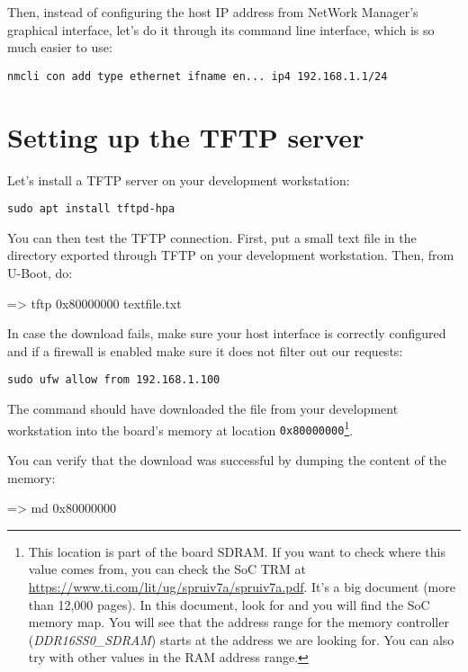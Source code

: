 Then, instead of configuring the host IP address from NetWork Manager's
graphical interface, let's do it through its command line interface,
which is so much easier to use:

\begin{verbatim}
nmcli con add type ethernet ifname en... ip4 192.168.1.1/24
\end{verbatim}

\section{Setting up the TFTP server}

Let's install a TFTP server on your development workstation:

\begin{verbatim}
sudo apt install tftpd-hpa
\end{verbatim}

You can then test the TFTP connection. First, put a small text file in
the directory exported through TFTP on your development
workstation. Then, from U-Boot, do:

\begin{ubootinput}
=> tftp 0x80000000 textfile.txt
\end{ubootinput}

In case the download fails, make sure your host interface is correctly
configured and if a firewall is enabled make sure it does not filter out our
requests:
\begin{verbatim}
sudo ufw allow from 192.168.1.100
\end{verbatim}

The  command should have downloaded the
 file from your development workstation into
the board's memory at location {\tt 0x80000000}\footnote{
This location is part of the board SDRAM. If you want
to check where this value comes from, you can check the SoC
TRM at
\url{https://www.ti.com/lit/ug/spruiv7a/spruiv7a.pdf}.
It's a big document (more than 12,000 pages). In this document, look
for  and you will find the SoC memory map.
You will see that the address range for the memory controller
({\em DDR16SS0\_SDRAM})
starts at the address we are looking for.
You can also try with other values in the RAM address range.}.

You can verify that the download was successful by dumping the
content of the memory:

\begin{ubootinput}
=> md 0x80000000
\end{ubootinput}


